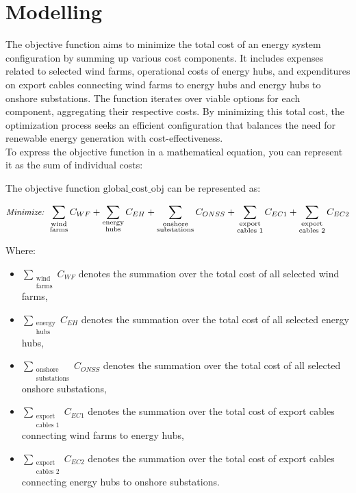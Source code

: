 \chapter{Modelling}

The objective function aims to minimize the total cost of an energy system configuration by summing up various cost components. It includes expenses related to selected wind farms, operational costs of energy hubs, and expenditures on export cables connecting wind farms to energy hubs and energy hubs to onshore substations. The function iterates over viable options for each component, aggregating their respective costs. By minimizing this total cost, the optimization process seeks an efficient configuration that balances the need for renewable energy generation with cost-effectiveness. \\


To express the objective function in a mathematical equation, you can represent it as the sum of individual costs:

The objective function \( \text{global\_cost\_obj} \) can be represented as:

\begin{equation}
\label{eq:objective_function}
\text{\small \emph{Minimize:} } \sum_{\substack{\text{wind} \\ \text{farms}}} C_{WF} + 
\sum_{\substack{\text{energy} \\ \text{hubs}}} C_{EH} + 
\sum_{\substack{\text{onshore} \\ \text{substations}}} C_{ONSS} +
\sum_{\substack{\text{export} \\ \text{cables 1}}} C_{EC1} + 
\sum_{\substack{\text{export} \\ \text{cables 2}}} C_{EC2}
\end{equation}


Where:
\begin{itemize}
    \item \( \sum_{\substack{\text{wind} \\ \text{farms}}} C_{WF} \) denotes the summation over the total cost of all selected wind farms,
    \item \( \sum_{\substack{\text{energy} \\ \text{hubs}}} C_{EH} \) denotes the summation over the total cost of all selected energy hubs,
    \item \( \sum_{\substack{\text{onshore} \\ \text{substations}}} C_{ONSS} \) denotes the summation over the total cost of all selected onshore substations,
    \item \( \sum_{\substack{\text{export} \\ \text{cables 1}}} C_{EC1} \) denotes the summation over the total cost of export cables connecting wind farms to energy hubs,
    \item \( \sum_{\substack{\text{export} \\ \text{cables 2}}} C_{EC2} \) denotes the summation over the total cost of export cables connecting energy hubs to onshore substations.
\end{itemize}


